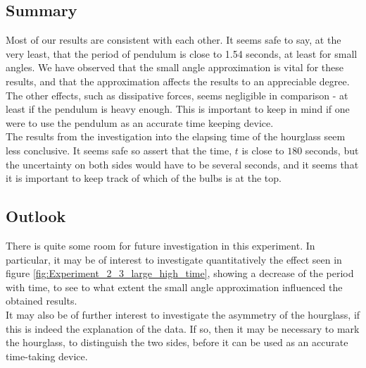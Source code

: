 \documentclass[a4paper, 10pt]{article}
\begin{document}
\subsection{Summary}
Most of our results are consistent with each other. It seems safe to say, at the very least, that the period of pendulum is close to 1.54 seconds, at least for small angles. We have observed that the small angle approximation is vital for these results, and that the approximation affects the results to an appreciable degree. The other effects, such as dissipative forces, seems negligible in comparison - at least if the pendulum is heavy enough. This is important to keep in mind if one were to use the pendulum as an accurate time keeping device.\\
\linebreak
The results from the investigation into the elapsing time of the hourglass seem less conclusive. It seems safe so assert that the time, $t$ is close to $180$ seconds, but the uncertainty on both sides would have to be several seconds, and it seems that it is important to keep track of which of the bulbs is at the top.
\subsection{Outlook}
There is quite some room for future investigation in this experiment. In particular, it may be of interest to investigate quantitatively the effect seen in figure \ref{fig:Experiment_2_3_large_high_time}, showing a decrease of the period with time, to see to what extent the small angle approximation influenced the obtained results.\\
\linebreak
It may also be of further interest to investigate the asymmetry of the hourglass, if this is indeed the explanation of the data. If so, then it may be necessary to mark the hourglass, to distinguish the two sides, before it can be used as an accurate time-taking device.
\pagebreak
{}

\end{document}
